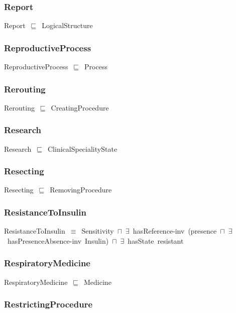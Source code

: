 \documentclass{article}
\begin{document}
\subsubsection*{Report}

Report~\ensuremath{\sqsubseteq}~LogicalStructure~

\subsubsection*{ReproductiveProcess}

ReproductiveProcess~\ensuremath{\sqsubseteq}~Process~

\subsubsection*{Rerouting}

Rerouting~\ensuremath{\sqsubseteq}~CreatingProcedure~

\subsubsection*{Research}

Research~\ensuremath{\sqsubseteq}~ClinicalSpecialityState~

\subsubsection*{Resecting}

Resecting~\ensuremath{\sqsubseteq}~RemovingProcedure~

\subsubsection*{ResistanceToInsulin}

ResistanceToInsulin~\ensuremath{\equiv}~Sensitivity~\ensuremath{\sqcap}~\ensuremath{\exists}~hasReference-inv~(presence~\ensuremath{\sqcap}~\ensuremath{\exists}~hasPresenceAbsence-inv~Insulin)~\ensuremath{\sqcap}~\ensuremath{\exists}~hasState~resistant

\subsubsection*{RespiratoryMedicine}

RespiratoryMedicine~\ensuremath{\sqsubseteq}~Medicine~

\subsubsection*{RestrictingProcedure}
\end{document}
